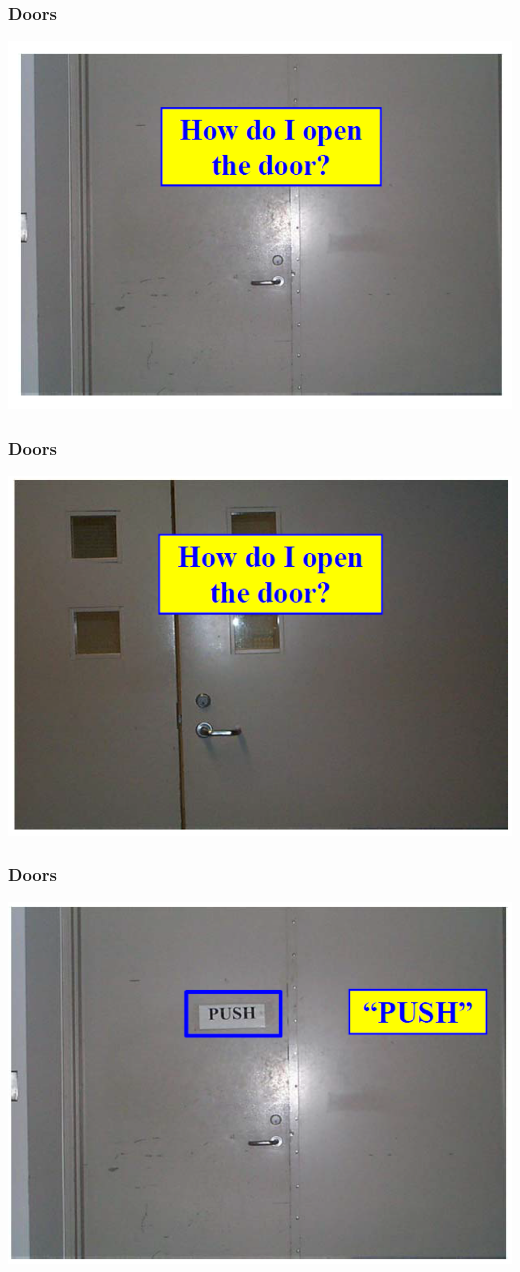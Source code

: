 \documentclass{beamer}
\begin{document}
\begin{frame}
\frametitle{Doors}
\centering
\includegraphics[width=0.8\linewidth]{door1}
\end{frame}

\begin{frame}
\frametitle{Doors}
\centering
\includegraphics[width=0.8\linewidth]{door2}
\end{frame}

\begin{frame}
\frametitle{Doors}
\centering
\includegraphics[width=0.8\linewidth]{door3}
\end{frame}
\end{document}
